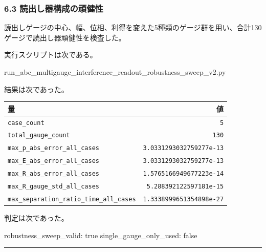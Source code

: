 \documentclass[
  a4paper,
]{article}
\newenvironment{Shaded}{}{}
\newcommand{\NormalTok}[1]{#1}
\newcounter{none} %
\begin{document}
\subsubsection{6.3
読出し器構成の頑健性}\label{ux8aadux51faux3057ux5668ux69cbux6210ux306eux9811ux5065ux6027}

読出しゲージの中心、幅、位相、利得を変えた5種類のゲージ群を用い、合計130ゲージで読出し器頑健性を検査した。

実行スクリプトは次である。

\begin{Shaded}
\begin{Highlighting}[]
\NormalTok{run\_abc\_multigauge\_interference\_readout\_robustness\_sweep\_v2.py}
\end{Highlighting}
\end{Shaded}

結果は次であった。

{\def\LTcaptype{none} %
\begin{longtable}[]{@{}lr@{}}
\toprule\noalign{}
量 & 値 \\
\midrule\noalign{}
\endhead
\bottomrule\noalign{}
\endlastfoot
\texttt{case\_count} & \texttt{5} \\
\texttt{total\_gauge\_count} & \texttt{130} \\
\texttt{max\_p\_abs\_error\_all\_cases} &
\texttt{3.0331293032759277e-13} \\
\texttt{max\_E\_abs\_error\_all\_cases} &
\texttt{3.0331293032759277e-13} \\
\texttt{max\_R\_abs\_error\_all\_cases} &
\texttt{1.5765166949677223e-14} \\
\texttt{max\_R\_gauge\_std\_all\_cases} &
\texttt{5.288392122597181e-15} \\
\texttt{max\_separation\_ratio\_time\_all\_cases} &
\texttt{1.3338999651354898e-27} \\
\end{longtable}
}

判定は次であった。

\begin{Shaded}
\begin{Highlighting}[]
\NormalTok{robustness\_sweep\_valid: true}
\NormalTok{single\_gauge\_only\_used: false}
\end{Highlighting}
\end{Shaded}

\begin{center}\rule{0.5\linewidth}{0.5pt}\end{center}
\end{document}
